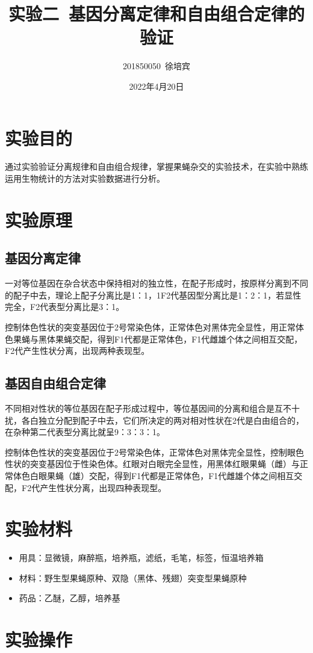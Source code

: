 \documentclass[UTF8]{article}
\title{实验二\ 基因分离定律和自由组合定律的验证}
\author{201850050\ 徐培宾}
\date{2022年4月20日}
\begin{document}
    \maketitle
    \section{实验目的}
    通过实验验证分离规律和自由组合规律，掌握果蝇杂交的实验技术，在实验中熟练运用生物统计的方法对实验数据进行分析。
    \section{实验原理}
    \subsection{基因分离定律}
    一对等位基因在杂合状态中保持相对的独立性，在配子形成时，按原样分离到不同的配子中去，理论上配子分离比是1：1，1F2代基因型分离比是1：2：1，若显性完全，F2代表型分离比是3：1。
    
    控制体色性状的突变基因位于2号常染色体，正常体色对黑体完全显性，用正常体色果蝇与黑体果蝇交配，得到F1代都是正常体色，F1代雌雄个体之间相互交配，F2代产生性状分离，出现两种表现型。
    \subsection{基因自由组合定律}
    不同相对性状的等位基因在配子形成过程中，等位基因间的分离和组合是互不十扰，各白独立分配到配子中去，它们所决定的两对相对性状在2代是白由组合的，在杂种第二代表型分离比就呈9：3：3：1。

    控制体色性状的突变基因位于2号常染色体，正常体色对黑体完全显性，控制眼色性状的突变基因位于性染色体。红眼对白眼完全显性，用黑体红眼果蝇（雌）与正常体色白眼果蝇（雄）交配，得到F1代都是正常体色，F1代雌雄个体之间相互交配，F2代产生性状分离，出现四种表现型。
    \section{实验材料}
    \begin{itemize}
        \item 用具：显微镜，麻醉瓶，培养瓶，滤纸，毛笔，标签，恒温培养箱
        \item 材料：野生型果蝇原种、双隐（黑体、残翅）突变型果蝇原种
        \item 药品：乙醚，乙醇，培养基
    \end{itemize}
    \section{实验操作}
\end{document}
